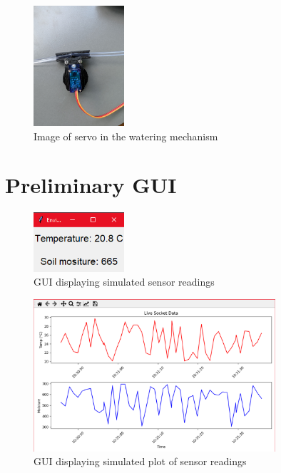 \documentclass[a4paper,11pt]{article}
\begin{document}
\begin{figure}[H]
    \centering
    \includegraphics[width=0.3\textwidth]{Servo.jpg}
    \caption{Image of servo in the watering mechanism}
    \label{fig:servo}
\end{figure}

\section{Preliminary GUI}

\begin{figure}[H]
    \centering
    \includegraphics[width=0.3\textwidth]{Dummy Readings.png}
    \caption{GUI displaying simulated sensor readings}
    \label{fig:prelim_GUI_readings}
\end{figure}

\begin{figure}[H]
    \centering
    \includegraphics[width=0.8\textwidth]{Dummy Plotting.png}
    \caption{GUI displaying simulated plot of sensor readings}
    \label{fig:prelim_GUI_plot}
\end{figure}
\end{document}

